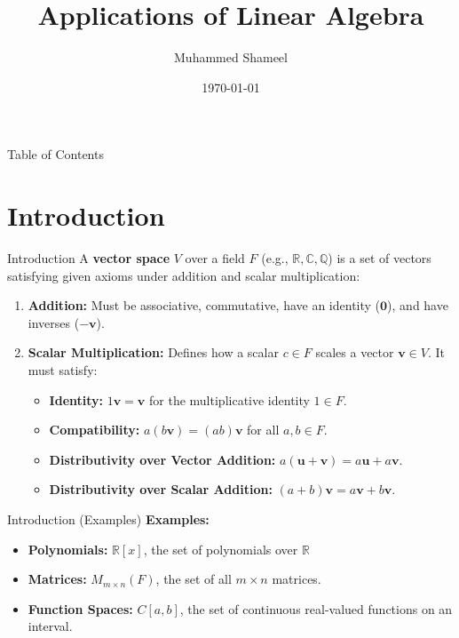 \documentclass{beamer}
\title{Applications of Linear Algebra}
\author{Muhammed Shameel}
\date{\today}
\begin{document}
\frame{\titlepage}

\begin{frame}{Table of Contents}
    \tableofcontents
\end{frame}

\section{Introduction}

\begin{frame}{Introduction}
    A \textbf{vector space} $V$ over a field $F$ (e.g., $\mathbb{R}, \mathbb{C}, \mathbb{Q}$) is a set of vectors satisfying given axioms under addition and scalar multiplication:
    \begin{enumerate}
        \item \textbf{Addition:} Must be associative, commutative, have an identity ($\mathbf{0}$), and have inverses ($-\mathbf{v}$).
        \item \textbf{Scalar Multiplication:} Defines how a scalar $c \in F$ scales a vector $\mathbf{v} \in V$. It must satisfy:
              \begin{itemize}
                  \item \textbf{Identity:} $1\mathbf{v} = \mathbf{v}$ for the multiplicative identity $1 \in F$.
                  \item \textbf{Compatibility:} $a(b\mathbf{v}) = (ab)\mathbf{v}$ for all $a, b \in F$.
                  \item \textbf{Distributivity over Vector Addition:} $a(\mathbf{u} + \mathbf{v}) = a\mathbf{u} + a\mathbf{v}$.
                  \item \textbf{Distributivity over Scalar Addition:} $(a + b)\mathbf{v} = a\mathbf{v} + b\mathbf{v}$.
              \end{itemize}
    \end{enumerate}
\end{frame}

\begin{frame}{Introduction (Examples)}
    \textbf{Examples:}
    \begin{itemize}
        \item \textbf{Polynomials:} $\mathbb{R}[x]$, the set of polynomials over $\mathbb{R}$
        \item \textbf{Matrices:} $M_{m \times n}(F)$, the set of all $m \times n$ matrices.
        \item \textbf{Function Spaces:} $C[a, b]$, the set of continuous real-valued functions on an interval.
    \end{itemize}
\end{frame}
\end{document}
